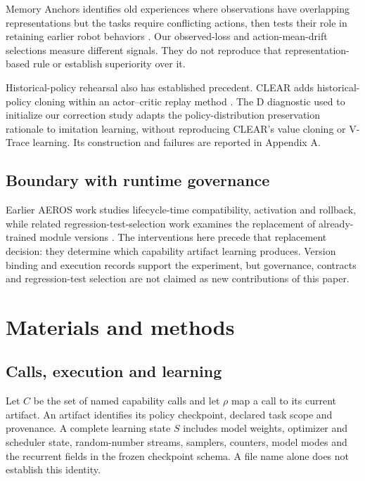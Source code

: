 \documentclass[10pt,letterpaper]{article}
\begin{document}
Memory Anchors identifies old experiences where observations have
overlapping representations but the tasks require conflicting actions,
then tests their role in retaining earlier robot behaviors
\cite{du2026memoryanchorscontinualrobot}. Our observed-loss and
action-mean-drift selections measure different signals. They do not
reproduce that representation-based rule or establish superiority over
it.

Historical-policy rehearsal also has established precedent. CLEAR adds
historical-policy cloning within an actor--critic replay method
\cite{NEURIPS2019_fa7cdfad}. The D diagnostic used to initialize our
correction study adapts the policy-distribution preservation rationale
to imitation learning, without reproducing CLEAR's value cloning or
V-Trace learning. Its construction and failures are reported in Appendix
A.

\subsection{Boundary with runtime
governance}\label{boundary-with-runtime-governance}

Earlier AEROS work studies lifecycle-time compatibility, activation and
rollback, while related regression-test-selection work examines the
replacement of already-trained module versions
\cite{qin2026governedcapabilityevolution, qin2026regressiontestselectionupdated}.
The interventions here precede that replacement decision: they determine
which capability artifact learning produces. Version binding and
execution records support the experiment, but governance, contracts and
regression-test selection are not claimed as new contributions of this
paper.

\section{Materials and methods}\label{materials-and-methods}

\subsection{Calls, execution and
learning}\label{calls-execution-and-learning}

Let \(C\) be the set of named capability calls and let \(\rho\) map a
call to its current artifact. An artifact identifies its policy
checkpoint, declared task scope and provenance. A complete learning
state \(S\) includes model weights, optimizer and scheduler state,
random-number streams, samplers, counters, model modes and the recurrent
fields in the frozen checkpoint schema. A file name alone does not
establish this identity.
\end{document}
